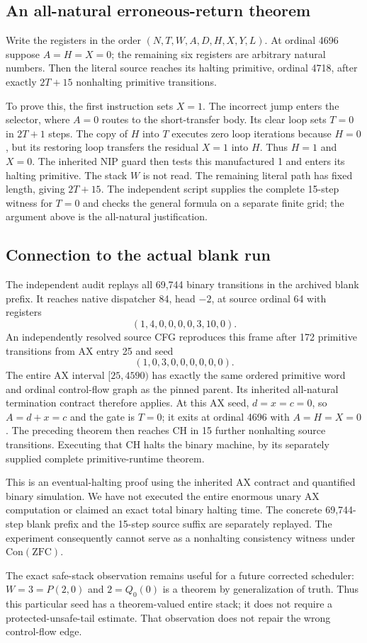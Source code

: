 \subsection{An all-natural erroneous-return theorem}
Write the registers in the order
$(N,T,W,A,D,H,X,Y,L)$.  At ordinal 4696 suppose $A=H=X=0$;
the remaining six registers are arbitrary natural numbers.  Then the literal
source reaches its halting primitive, ordinal 4718, after exactly
$2T+15$ nonhalting primitive transitions.

To prove this, the first instruction sets $X=1$.  The incorrect jump enters
the selector, where $A=0$ routes to the short-transfer body.  Its clear loop
sets $T=0$ in $2T+1$ steps.  The copy of $H$ into $T$ executes zero loop
iterations because $H=0$, but its restoring loop transfers the residual
$X=1$ into $H$.  Thus $H=1$ and $X=0$.  The inherited NIP guard then tests
this manufactured 1 and enters its halting primitive.  The stack $W$ is not
read.  The remaining literal path has fixed length, giving $2T+15$.
The independent script supplies the complete 15-step witness for $T=0$ and
checks the general formula on a separate finite grid; the argument above is
the all-natural justification.

\subsection{Connection to the actual blank run}
The independent audit replays all 69,744 binary transitions in the archived
blank prefix.  It reaches native dispatcher 84, head $-2$, at source ordinal
64 with registers
\[
 (1,4,0,0,0,0,3,10,0).
\]
An independently resolved source CFG reproduces this frame after 172
primitive transitions from AX entry 25 and seed
\[
 (1,0,3,0,0,0,0,0,0).
\]
The entire AX interval $[25,4590)$ has exactly the same ordered primitive
word and ordinal control-flow graph as the pinned parent.  Its inherited
all-natural termination contract therefore applies.  At this AX seed, $d=x=c=0$, so $A=d+x=c$ and the gate is $T=0$;
it exits at ordinal 4696
with $A=H=X=0$.
The preceding theorem then reaches CH in 15 further nonhalting source
transitions.  Executing that CH halts the binary machine, by its separately
supplied complete primitive-runtime theorem.

This is an eventual-halting proof using the inherited AX contract and
quantified binary simulation.  We have not executed the entire enormous
unary AX computation or claimed an exact total binary halting time.
The concrete 69,744-step blank prefix and the 15-step source suffix are
separately replayed.  The experiment consequently cannot serve as a
nonhalting consistency witness under $\mathrm{Con}(\mathrm{ZFC})$.

The exact safe-stack observation remains useful for a future corrected
scheduler: $W=3=P(2,0)$ and $2=Q_0(0)$ is a theorem by generalization of
truth.  Thus this particular seed has a theorem-valued entire stack; it
does not require a protected-unsafe-tail estimate.  That observation does
not repair the wrong control-flow edge.
